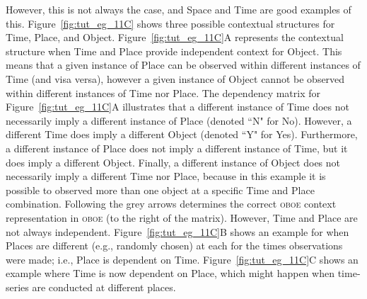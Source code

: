 \documentclass[article,oneside]{memoir}
\newcommand{\obs}{\textsc{oboe}}
\begin{document}
\begin{figure}[hbtp]
\end{figure}

However, this is not always the case, and Space and Time are good
examples of this.  Figure~\ref{fig:tut_eg_11C} shows three possible
contextual structures for Time, Place, and Object.
Figure~\ref{fig:tut_eg_11C}A represents the contextual structure when
Time and Place provide independent context for Object.  This means
that a given instance of Place can be observed within different
instances of Time (and visa versa), however a given instance of Object
cannot be observed within different instances of Time nor Place.  The
dependency matrix for Figure~\ref{fig:tut_eg_11C}A illustrates that a
different instance of Time does not necessarily imply a different
instance of Place (denoted ``N" for No).  However, a different Time
does imply a different Object (denoted ``Y" for Yes).  Furthermore, a
different instance of Place does not imply a different instance of
Time, but it does imply a different Object.  Finally, a different
instance of Object does not necessarily imply a different Time nor
Place, because in this example it is possible to observed more than
one object at a specific Time and Place combination.  Following the
grey arrows determines the correct \obs{} context representation in
\obs{} (to the right of the matrix).  However, Time and Place are not
always independent.  Figure~\ref{fig:tut_eg_11C}B shows an example for
when Places are different (e.g., randomly chosen) at each for the
times observations were made; i.e., Place is dependent on Time.
Figure~\ref{fig:tut_eg_11C}C shows an example where Time is now
dependent on Place, which might happen when time-series are conducted
at different places.
\end{document}

